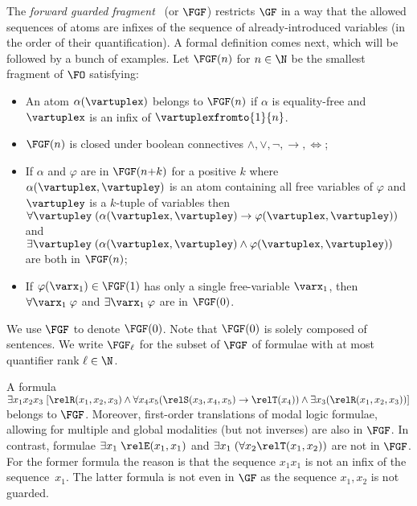 The \emph{forward guarded fragment}~\cite[Sec. 3.1]{Bednarczyk21} (or $\FGF$) restricts $\GF$ in a way that the allowed sequences of atoms are infixes of the sequence of already-introduced variables (in the order of their quantification).
A formal definition comes next, which will be followed by a bunch of examples.
Let $\FGF(n)$ for $n \in \N$ be the smallest fragment of $\FO$ satisfying:
\begin{itemize}\itemsep0em
    \item An atom $\alpha(\vartuplex)$ belongs to $\FGF(n)$ if $\alpha$ is equality-free and $\vartuplex$ is an infix of $\vartuplexfromto{1}{n}$.
    \item $\FGF(n)$ is closed under boolean connectives $\land, \lor, \neg, \to, \iff$;
    \item If $\alpha$ and $\varphi$ are in $\FGF(n{+}k)$ for a positive $k$ where $\alpha(\vartuplex, \vartupley)$ is an atom containing all free variables of $\varphi$ and $\vartupley$ is a $k$-tuple of variables then $\forall{\vartupley} \; (\alpha(\vartuplex, \vartupley) \to \varphi(\vartuplex, \vartupley))$ and $\exists{\vartupley} \; (\alpha(\vartuplex, \vartupley) \land \varphi(\vartuplex, \vartupley))$ are both in $\FGF(n)$;
    \item If $\varphi(\varx_1) \in \FGF(1)$ has only a single free-variable $\varx_1$, then $\forall{\varx_1}\; \varphi$ and $\exists{\varx_1}\; \varphi$ are in $\FGF(0)$.
\end{itemize}
We use $\FGF$ to denote $\FGF(0)$. Note that $\FGF(0)$ is solely composed of sentences.
We write $\FGF_{\ell}$ for the subset of $\FGF$ of formulae with at most quantifier rank $\ell \in \N$.

\begin{example}
A formula $\exists{x_1x_{2}x_{3}}\; [\relR(x_{1}, x_{2}, x_{3}) \land \forall{x_{4}x_{5}}(\relS(x_{3}, x_{4}, x_{5}) \to \relT(x_{4})) \land \exists{x_{3}}(\relR(x_{1}, x_{2}, x_{3}))]$ belongs to $\FGF$.
Moreover, first-order translations of modal logic formulae, allowing for multiple and global modalities (but not inverses) are also in $\FGF$.
In contrast, formulae $\exists{x_{1}}\; \relE(x_{1}, x_{1})$ and $\exists{x_{1}}\; (\forall{x_{2}} \relT(x_{1}, x_{2}))$ are not in $\FGF$.
For the former formula the reason is that the sequence $x_1x_1$ is not an infix of the sequence~$x_1$.
The latter formula is not even in $\GF$ as the sequence $x_{1}, x_{2}$ is not guarded.
\end{example}
